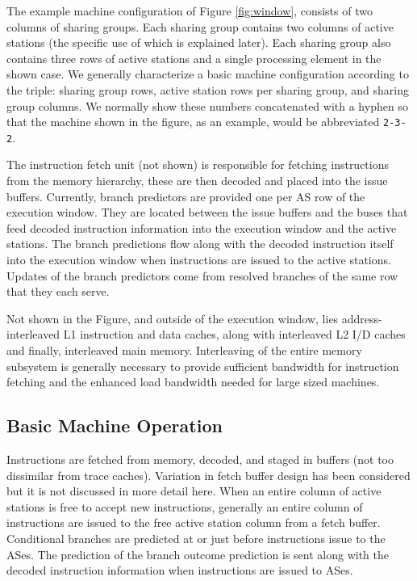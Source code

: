 \documentclass[10pt,dvips]{article}
\begin{document}
The example 
machine configuration
of Figure \ref{fig:window}, 
consists of 
two columns of sharing groups.  Each sharing group contains two columns of
active stations (the specific use of which is explained later).
Each sharing group also contains three rows of active stations
and a single processing element in the shown case.  
We generally characterize
a basic machine configuration according to the triple: sharing group
rows, active station
rows per sharing group, and sharing group columns.  We normally
show these numbers concatenated with a hyphen so that the machine shown
in the figure, as an example, would be abbreviated {\tt 2-3-2}.

The instruction fetch unit (not shown) is responsible for
fetching instructions from the memory hierarchy, these are then decoded
and placed into the issue buffers.   
Currently, branch predictors are provided one per AS row of the execution
window.  
They are located between the issue buffers and the buses that feed
decoded instruction information into the execution window and the
active stations.  
The branch predictions flow along with
the decoded instruction itself into the
execution window when instructions are issued to the active stations.
Updates of the branch predictors come from resolved branches
of the same row that they each serve.

Not shown in the Figure, and outside of the execution window,
lies address-interleaved L1 instruction and data caches, along with
interleaved L2 I/D caches and finally, interleaved main memory.
Interleaving of the entire memory subsystem is generally necessary
to provide sufficient bandwidth for instruction fetching and the
enhanced load bandwidth needed for large sized machines.
%
\subsection{Basic Machine Operation}
%
Instructions are fetched from memory, decoded, and staged in buffers
(not too dissimilar from trace caches).  Variation in fetch buffer
design has been considered but it is not discussed in more detail here.
When an entire column
of active stations is free to accept new instructions, generally
an entire column of instructions are issued to the free active station
column from a fetch buffer.
Conditional branches are
predicted at or just before instructions issue to the ASes.
The prediction of the branch outcome 
prediction is sent along with the
decoded instruction information when instructions are issued to
ASes.
\end{document}

